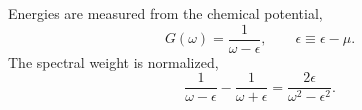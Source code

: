 \documentclass{article}
\begin{document}
Energies are measured from the chemical potential,
\begin{equation}
G(\omega) = \frac{1}{\omega - \epsilon}, \qquad \epsilon \equiv \epsilon - \mu .
\label{eq:g}
\end{equation}
The spectral weight is normalized,
\begin{equation}
\frac{1}{\omega-\epsilon} - \frac{1}{\omega+\epsilon} = \frac{2\epsilon}{\omega^2-\epsilon^2} .
\label{eq:pp}
\end{equation}
\end{document}

